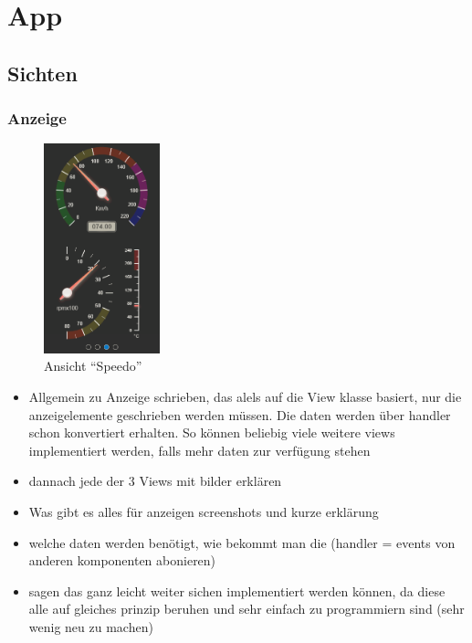 \section{App}

\subsection{Sichten}

\subsubsection{Anzeige}
\label{sec:appSichtAnzeige}

\begin{figure}
  \begin{center}
	\includegraphics[width=0.3\textwidth]{./img/App_Speedo}
	\caption{Ansicht \enquote{Speedo}}
	\label{fig:App_Speedo}
  \end{center}
\end{figure}


\begin{itemize}
\item Allgemein zu Anzeige schrieben, das alels auf die View klasse basiert, nur die anzeigelemente geschrieben werden müssen. Die daten werden über handler schon konvertiert erhalten. So können beliebig viele weitere views implementiert werden, falls mehr daten zur verfügung stehen
\item dannach jede der 3 Views mit bilder erklären

\item Was gibt es alles für anzeigen screenshots und kurze erklärung
\item welche daten werden benötigt, wie bekommt man die (handler = events von anderen komponenten abonieren) 
\item sagen das ganz leicht weiter sichen implementiert werden können, da diese alle auf gleiches prinzip beruhen und sehr einfach zu programmiern sind (sehr wenig neu zu machen)
\end{itemize}

